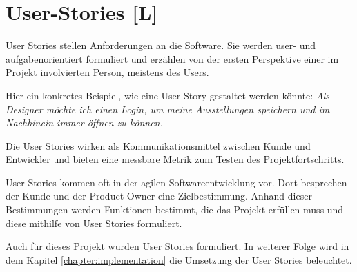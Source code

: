 \section{User-Stories [L]}
\label{ch:user-stories}
User Stories stellen Anforderungen an die Software. Sie werden user- und aufgabenorientiert formuliert und erzählen von der ersten Perspektive einer im Projekt involvierten Person, meistens des Users. \cite{AgileVorgehensmodelle}
 
Hier ein konkretes Beispiel, wie eine User Story gestaltet werden könnte: 
\emph{Als Designer möchte ich einen Login, um meine Ausstellungen speichern und im Nachhinein immer öffnen zu können.}

Die User Stories wirken als Kommunikationsmittel zwischen Kunde und Entwickler und bieten eine messbare Metrik zum Testen des Projektfortschritts. \cite{AgileVorgehensmodelle}

User Stories kommen oft in der agilen Softwareentwicklung vor. Dort besprechen der Kunde und der Product Owner eine Zielbestimmung. Anhand dieser Bestimmungen werden Funktionen bestimmt, die das Projekt erfüllen muss und diese mithilfe von User Stories formuliert. \cite{AgileVorgehensmodelle}

Auch für dieses Projekt wurden User Stories formuliert.
In weiterer Folge wird in dem Kapitel \ref{chapter:implementation} die Umsetzung der User Stories beleuchtet.





